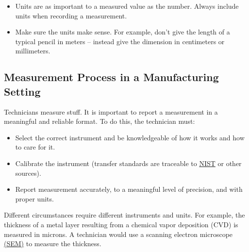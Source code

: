 \documentclass{ximera}
\begin{document}




\begin{warning}
\begin{itemize}
    \item Units are as important to a measured value as the number. Always include units when recording a measurement. 
\item Make sure the units make sense. For example, don’t give the length of a typical pencil in meters -- instead give the dimension in centimeters or millimeters.
\end{itemize}
\end{warning}

 

 \subsection*{Measurement Process in a Manufacturing Setting}
 Technicians measure stuff.  It is important to report a measurement in a meaningful and reliable format.
To do this, the technician must:
\begin{itemize}
\item Select the correct instrument and be knowledgeable of how it works and how to care for it.
\item Calibrate the instrument (transfer standards are traceable to \href{https://www.nist.gov/}{NIST} or other sources).
\item Report  measurement accurately, to a meaningful level of precision, and with proper units.
\end{itemize}

Different circumstances require different instruments and units.  For example, the thickness of a metal layer resulting from a chemical vapor deposition (CVD) is measured in microns.  A technician would use a scanning electron microscope \href{https://www.nist.gov/news-events/news/2023/05/leveling-sem-measurements-chip-manufacturing}{(SEM)} to measure the thickness.
\end{document}
